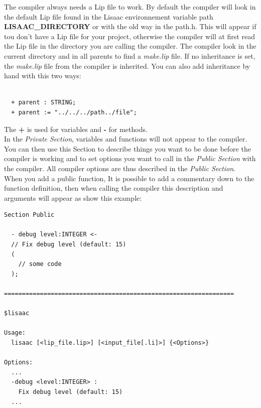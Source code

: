 \documentclass[11pt]{mybook}
\begin{document}
The compiler always needs a Lip file to work. By default the compiler will look
in the default Lip file found in the Lisaac environnement variable path
\textbf{LISAAC\_DIRECTORY} or with the old way in the path.h. This will appear
if tou don't have a Lip file for your project, otherwise the compiler will at
first read the Lip file in the directory you are calling the compiler. The
compiler look in the current directory and in all parents to find a
\textit{make.lip} file. If no inheritance is set, the \textit{make.lip} file
from the compiler is inherited. You can also add inheritance by hand with this
two ways:

\begin{lstlisting}

  + parent : STRING;
  + parent := "../../../path../file";

\end{lstlisting}

The \textbf{+} is used for variables and \textbf{-} for methods.\\

In the \textit{Private Section}, variables and functions will not appear to the
compiler. You can then use this Section to describe things you want to be done
before the compiler is working and to set options you want to call in the
\textit{Public Section} with the compiler. All compiler options are thus
described in the \textit{Public Section}. \\

When you add a public function, It is possible to add a commentary down to the
function definition, then when calling the compiler this description and
arguments will appear as show this example:\\


\begin{lstlisting}
Section Public
  
  - debug level:INTEGER <-
  // Fix debug level (default: 15)
  (
    // some code
  );

================================================================

$lisaac

Usage:                                                          
  lisaac [<lip_file.lip>] [<input_file[.li]>] {<Options>}       
                                                                  
Options:          
  ...
  -debug <level:INTEGER> :
    Fix debug level (default: 15)
  ...
\end{lstlisting}
\end{document}
